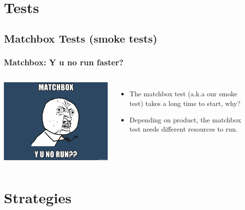 \documentclass[xcolor=pdftex,dvipsnames,table]{beamer}
\begin{document}
\section{Tests}
\subsection{Matchbox Tests (smoke tests)}
\begin{frame}
  \frametitle{Matchbox: Y u no run faster?}
  \begin{columns}[cc]
  \column{0.7 in}
  \includegraphics[scale=0.33]{matchbox.jpg}
  \column{2.3 in}
  \begin{itemize}
    \item The matchbox test (a.k.a our smoke test) takes a long time to start, why?
    \item Depending on product, the matchbox test
      needs different resources to run.
  \end{itemize}
  \end{columns}
\end{frame}

\section{Strategies}
\end{document}
